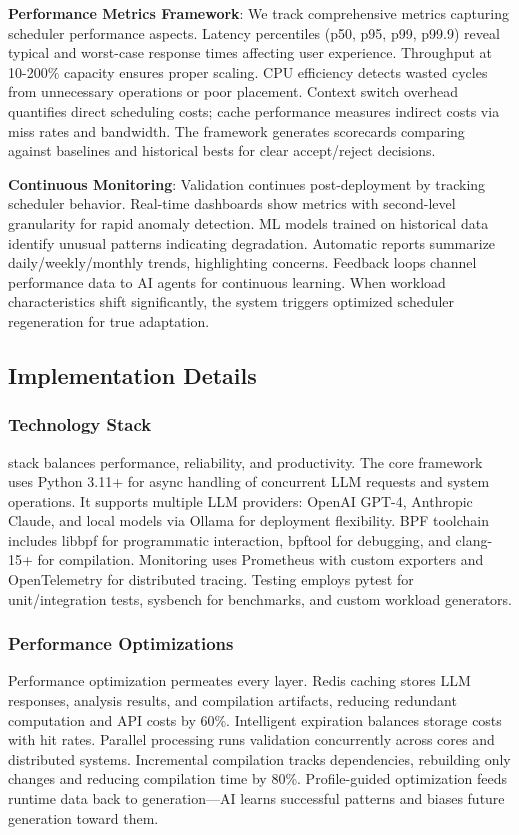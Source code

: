 \textbf{Performance Metrics Framework}: We track comprehensive metrics capturing scheduler performance aspects. Latency percentiles (p50, p95, p99, p99.9) reveal typical and worst-case response times affecting user experience. Throughput at 10-200\% capacity ensures proper scaling. CPU efficiency detects wasted cycles from unnecessary operations or poor placement. Context switch overhead quantifies direct scheduling costs; cache performance measures indirect costs via miss rates and bandwidth. The framework generates scorecards comparing against baselines and historical bests for clear accept/reject decisions.

\textbf{Continuous Monitoring}: Validation continues post-deployment by tracking scheduler behavior. Real-time dashboards show metrics with second-level granularity for rapid anomaly detection. ML models trained on historical data identify unusual patterns indicating degradation. Automatic reports summarize daily/weekly/monthly trends, highlighting concerns. Feedback loops channel performance data to AI agents for continuous learning. When workload characteristics shift significantly, the system triggers optimized scheduler regeneration for true adaptation.


\subsection{Implementation Details}

\subsubsection{Technology Stack}
\sys stack balances performance, reliability, and productivity. The core framework uses Python 3.11+ for async handling of concurrent LLM requests and system operations. It supports multiple LLM providers: OpenAI GPT-4, Anthropic Claude, and local models via Ollama for deployment flexibility. BPF toolchain includes libbpf for programmatic interaction, bpftool for debugging, and clang-15+ for compilation. Monitoring uses Prometheus with custom exporters and OpenTelemetry for distributed tracing. Testing employs pytest for unit/integration tests, sysbench for benchmarks, and custom workload generators.

\subsubsection{Performance Optimizations}
Performance optimization permeates every layer. Redis caching stores LLM responses, analysis results, and compilation artifacts, reducing redundant computation and API costs by 60\%. Intelligent expiration balances storage costs with hit rates. Parallel processing runs validation concurrently across cores and distributed systems. Incremental compilation tracks dependencies, rebuilding only changes and reducing compilation time by 80\%. Profile-guided optimization feeds runtime data back to generation—AI learns successful patterns and biases future generation toward them.

